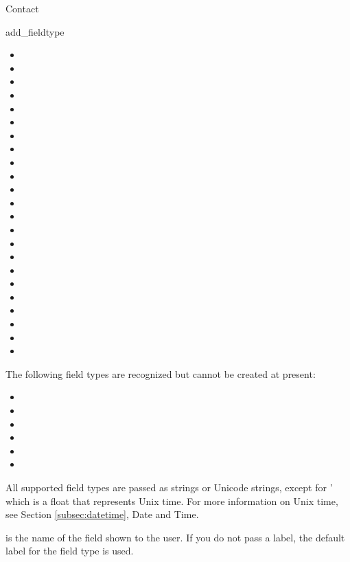 \begin{classdesc*}{Contact}
\begin{methoddesc}[Contact]{add_field}{type }
\begin{itemize}
\item {}
\item {}
\item {}
\item {}
\item {}
\item {}
\item {}
\item {}
\item {}
\item {}
\item {}
\item {}
\item {}
\item {}
\item {}
\item {}
\item {}
\item {}
\item {}
\item {}
\item {}
\item {}
\item {}
\end{itemize}

The following field types are recognized but cannot be created at present:

\begin{itemize}
\item {}
\item {}
\item {}
\item {}
\item {}
\item {}
\end{itemize}

All supported field types are passed as strings or Unicode strings, except for 
' which is a float that represents Unix time. For more information 
on Unix time, see Section \ref{subsec:datetime}, Date and Time.

 is the name of the field shown to the user. If you 
do not pass a label, the default label for the field type is used.


\end{methoddesc}
\end{classdesc*}
